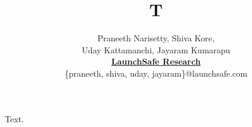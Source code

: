 \documentclass{article}
\title{T}
\author{Praneeth Narisetty, Shiva Kore,\\[2pt]
Uday Kattamanchi, Jayaram Kumarapu\\[3pt]
\href{https://launchsafe.com}{\textbf{LaunchSafe Research}}\\[2pt]
\{praneeth, shiva, uday, jayaram\}@launchsafe.com}
\begin{document}
\maketitle
Text.
\end{document}
